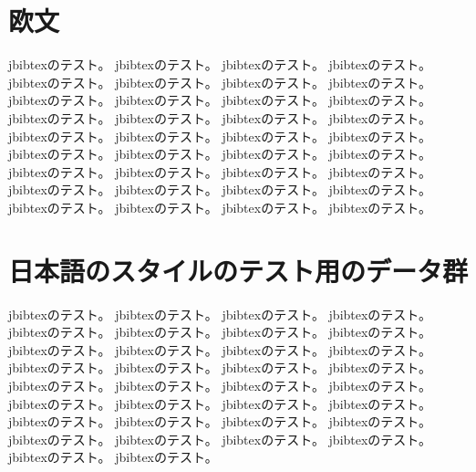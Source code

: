 \documentclass{ujarticle}
\begin{document}
\selectfont
\section{欧文}

jbibtexのテスト\cite{article-minimal}。
jbibtexのテスト\cite{article-full}。
jbibtexのテスト\cite{article-crossref}。
jbibtexのテスト\cite{whole-journal}。
jbibtexのテスト\cite{inbook-minimal}。
jbibtexのテスト\cite{inbook-full}。
jbibtexのテスト\cite{inbook-crossref}。
jbibtexのテスト\cite{book-minimal}。
jbibtexのテスト\cite{book-full}。
jbibtexのテスト\cite{book-crossref}。
jbibtexのテスト\cite{whole-set}。
jbibtexのテスト\cite{booklet-minimal}。
jbibtexのテスト\cite{booklet-full}。
jbibtexのテスト\cite{incollection-minimal}。
jbibtexのテスト\cite{incollection-full}。
jbibtexのテスト\cite{incollection-crossref}。
jbibtexのテスト\cite{whole-collection}。
jbibtexのテスト\cite{manual-minimal}。
jbibtexのテスト\cite{manual-full}。
jbibtexのテスト\cite{mastersthesis-minimal}。
jbibtexのテスト\cite{mastersthesis-full}。
jbibtexのテスト\cite{misc-minimal}。
jbibtexのテスト\cite{misc-full}。
jbibtexのテスト\cite{inproceedings-minimal}。
jbibtexのテスト\cite{inproceedings-full}。
jbibtexのテスト\cite{inproceedings-crossref}。
jbibtexのテスト\cite{proceedings-minimal}。
jbibtexのテスト\cite{proceedings-full}。
jbibtexのテスト\cite{whole-proceedings}。
jbibtexのテスト\cite{phdthesis-minimal}。
jbibtexのテスト\cite{phdthesis-full}。
jbibtexのテスト\cite{techreport-minimal}。
jbibtexのテスト\cite{techreport-full}。
jbibtexのテスト\cite{unpublished-minimal}。
jbibtexのテスト\cite{unpublished-full}。
jbibtexのテスト\cite{random-note-crossref}。

\section{日本語のスタイルのテスト用のデータ群}

jbibtexのテスト\cite{inbook-full-j}。
jbibtexのテスト\cite{incol-full-j-1}。
jbibtexのテスト\cite{article-crossref-j}。
jbibtexのテスト\cite{article-crossref-jj}。
jbibtexのテスト\cite{whole-journal-j}。
jbibtexのテスト\cite{inbook-crossref-j}。
jbibtexのテスト\cite{whole-set-j}。
jbibtexのテスト\cite{inbook-crossref-j-1}。
jbibtexのテスト\cite{cvs}。
jbibtexのテスト\cite{ha}。
jbibtexのテスト\cite{costa}。
jbibtexのテスト\cite{mcclella}。
jbibtexのテスト\cite{dug}。
jbibtexのテスト\cite{sakawa}。
jbibtexのテスト\cite{ssl}。
jbibtexのテスト\cite{newman}。
jbibtexのテスト\cite{Rich}。
jbibtexのテスト\cite{goto}。
jbibtexのテスト\cite{磯崎}。
jbibtexのテスト\cite{斉藤}。
jbibtexのテスト\cite{sym}。
jbibtexのテスト\cite{eda}。
jbibtexのテスト\cite{dss}。
jbibtexのテスト\cite{cm}。
jbibtexのテスト\cite{reduce}。
jbibtexのテスト\cite{fp}。
jbibtexのテスト\cite{la}。
jbibtexのテスト\cite{あふれ無し}。
jbibtexのテスト\cite{ダム}。
jbibtexのテスト\cite{人名表記}。
jbibtexのテスト\cite{EUC日本語TeX}。
jbibtexのテスト\cite{multi}。
jbibtexのテスト\cite{marumoji}。
jbibtexのテスト\cite{maru}。
\end{document}
